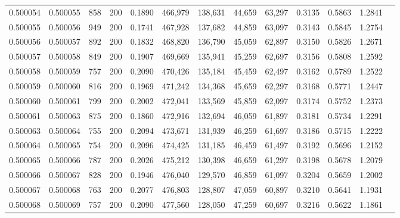 \begin{tabular}{rrrrrrrrrrrrr}
0.500054 & 0.500055 &    858 & 200 &                                     0.1890 & 466,979 & 138,631 &  44,659 &  63,297 & 0.3135 & 0.5863 & 1.2841 \\
0.500055 & 0.500056 &    949 & 200 &                                     0.1741 & 467,928 & 137,682 &  44,859 &  63,097 & 0.3143 & 0.5845 & 1.2754 \\
0.500056 & 0.500057 &    892 & 200 &                                     0.1832 & 468,820 & 136,790 &  45,059 &  62,897 & 0.3150 & 0.5826 & 1.2671 \\
0.500057 & 0.500058 &    849 & 200 &                                     0.1907 & 469,669 & 135,941 &  45,259 &  62,697 & 0.3156 & 0.5808 & 1.2592 \\
0.500058 & 0.500059 &    757 & 200 &                                     0.2090 & 470,426 & 135,184 &  45,459 &  62,497 & 0.3162 & 0.5789 & 1.2522 \\
0.500059 & 0.500060 &    816 & 200 &                                     0.1969 & 471,242 & 134,368 &  45,659 &  62,297 & 0.3168 & 0.5771 & 1.2447 \\
0.500060 & 0.500061 &    799 & 200 &                                     0.2002 & 472,041 & 133,569 &  45,859 &  62,097 & 0.3174 & 0.5752 & 1.2373 \\
0.500061 & 0.500063 &    875 & 200 &                                     0.1860 & 472,916 & 132,694 &  46,059 &  61,897 & 0.3181 & 0.5734 & 1.2291 \\
0.500063 & 0.500064 &    755 & 200 &                                     0.2094 & 473,671 & 131,939 &  46,259 &  61,697 & 0.3186 & 0.5715 & 1.2222 \\
0.500064 & 0.500065 &    754 & 200 &                                     0.2096 & 474,425 & 131,185 &  46,459 &  61,497 & 0.3192 & 0.5696 & 1.2152 \\
0.500065 & 0.500066 &    787 & 200 &                                     0.2026 & 475,212 & 130,398 &  46,659 &  61,297 & 0.3198 & 0.5678 & 1.2079 \\
0.500066 & 0.500067 &    828 & 200 &                                     0.1946 & 476,040 & 129,570 &  46,859 &  61,097 & 0.3204 & 0.5659 & 1.2002 \\
0.500067 & 0.500068 &    763 & 200 &                                     0.2077 & 476,803 & 128,807 &  47,059 &  60,897 & 0.3210 & 0.5641 & 1.1931 \\
0.500068 & 0.500069 &    757 & 200 &                                     0.2090 & 477,560 & 128,050 &  47,259 &  60,697 & 0.3216 & 0.5622 & 1.1861 \\

\end{tabular}
